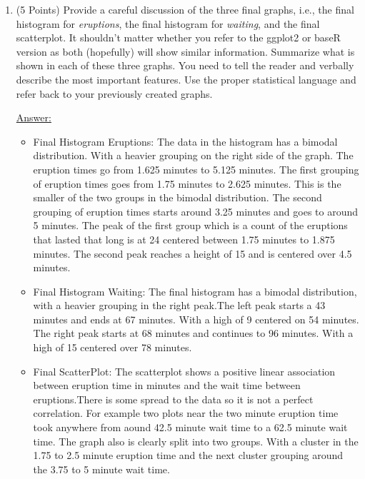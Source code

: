 \documentclass[12pt,letterpaper,final]{article}
\begin{document}
\begin{enumerate}
\begin{enumerate}
\item (5 Points) Provide a careful discussion of the three final graphs, i.e.,
the final histogram for {\it eruptions}, the final histogram for {\it waiting},
and the final scatterplot. It shouldn't matter whether you refer to the ggplot2 or baseR
version as both (hopefully) will show similar information.
Summarize what is shown in each of these three graphs. You need to tell the
reader and verbally describe the most important features.
Use the proper statistical language and refer back to your previously created graphs.

\underline{Answer:}
\begin{itemize}
\item Final Histogram Eruptions: The data in the histogram has a bimodal distribution. With a heavier grouping on the right side of the graph. The eruption times go from 1.625 minutes to 5.125 minutes. The first grouping of eruption times goes from 1.75 minutes to 2.625 minutes. This is the smaller of the two groups in the bimodal distribution. The second grouping of eruption times starts around 3.25 minutes and goes to around 5 minutes. The peak of the first group which is a count of the eruptions that lasted that long is at 24 centered between 1.75 minutes to 1.875 minutes. The second peak reaches a height of 15 and is centered  over 4.5 minutes.

\item Final Histogram Waiting: The final histogram has a bimodal distribution, with a heavier grouping in the right peak.The left peak starts a 43 minutes and ends at 67 minutes. With a high of 9 centered on 54 minutes. The right peak starts at 68 minutes and continues to 96 minutes. With a high of 15 centered over 78 minutes.

\item Final ScatterPlot: The scatterplot shows a positive linear association between eruption time in minutes and the wait time between eruptions.There is some spread to the data so it is not a perfect correlation. For example two plots near the two minute eruption time took anywhere from aound 42.5 minute wait time to a 62.5 minute wait time. The graph also is clearly split into two groups. With a cluster in the 1.75 to 2.5 minute eruption time and the next cluster grouping around the 3.75 to 5 minute wait time.

\end{itemize}






\end{enumerate}
\end{enumerate}
\end{document}
